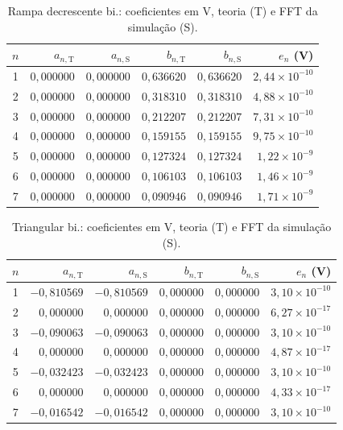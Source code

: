\begin{table}[H]
\centering
\footnotesize\setlength{\tabcolsep}{2pt}
\caption{Rampa decrescente bi.: coeficientes em V, teoria (T) e FFT da simulação (S).}\label{tab:coef_comp5}
\begin{tabular}{crrrrr}\hline
$n$ & $a_{n,\mathrm T}$ & $a_{n,\mathrm S}$ & $b_{n,\mathrm T}$ & $b_{n,\mathrm S}$ & $e_n$ (V) \\ \hline
1 & $0{,}000000$ & $0{,}000000$ & $0{,}636620$ & $0{,}636620$ & $2{,}44\!\times\!10^{-10}$ \\
2 & $0{,}000000$ & $0{,}000000$ & $0{,}318310$ & $0{,}318310$ & $4{,}88\!\times\!10^{-10}$ \\
3 & $0{,}000000$ & $0{,}000000$ & $0{,}212207$ & $0{,}212207$ & $7{,}31\!\times\!10^{-10}$ \\
4 & $0{,}000000$ & $0{,}000000$ & $0{,}159155$ & $0{,}159155$ & $9{,}75\!\times\!10^{-10}$ \\
5 & $0{,}000000$ & $0{,}000000$ & $0{,}127324$ & $0{,}127324$ & $1{,}22\!\times\!10^{-9}$ \\
6 & $0{,}000000$ & $0{,}000000$ & $0{,}106103$ & $0{,}106103$ & $1{,}46\!\times\!10^{-9}$ \\
7 & $0{,}000000$ & $0{,}000000$ & $0{,}090946$ & $0{,}090946$ & $1{,}71\!\times\!10^{-9}$ \\
\hline\end{tabular}
\end{table}
\begin{table}[H]
\centering
\footnotesize\setlength{\tabcolsep}{2pt}
\caption{Triangular bi.: coeficientes em V, teoria (T) e FFT da simulação (S).}\label{tab:coef_comp6}
\begin{tabular}{crrrrr}\hline
$n$ & $a_{n,\mathrm T}$ & $a_{n,\mathrm S}$ & $b_{n,\mathrm T}$ & $b_{n,\mathrm S}$ & $e_n$ (V) \\ \hline
1 & $-0{,}810569$ & $-0{,}810569$ & $0{,}000000$ & $0{,}000000$ & $3{,}10\!\times\!10^{-10}$ \\
2 & $0{,}000000$ & $0{,}000000$ & $0{,}000000$ & $0{,}000000$ & $6{,}27\!\times\!10^{-17}$ \\
3 & $-0{,}090063$ & $-0{,}090063$ & $0{,}000000$ & $0{,}000000$ & $3{,}10\!\times\!10^{-10}$ \\
4 & $0{,}000000$ & $0{,}000000$ & $0{,}000000$ & $0{,}000000$ & $4{,}87\!\times\!10^{-17}$ \\
5 & $-0{,}032423$ & $-0{,}032423$ & $0{,}000000$ & $0{,}000000$ & $3{,}10\!\times\!10^{-10}$ \\
6 & $0{,}000000$ & $0{,}000000$ & $0{,}000000$ & $0{,}000000$ & $4{,}33\!\times\!10^{-17}$ \\
7 & $-0{,}016542$ & $-0{,}016542$ & $0{,}000000$ & $0{,}000000$ & $3{,}10\!\times\!10^{-10}$ \\
\hline\end{tabular}
\end{table}
